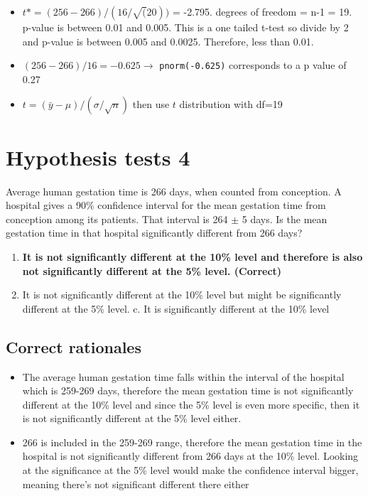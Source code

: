 \documentclass[letterpaper,9pt,twoside,printwatermark=false]{pinp}
\providecommand{\tightlist}{%
  \setlength{\itemsep}{0pt}\setlength{\parskip}{0pt}}
\begin{document}
\begin{itemize}
\tightlist
\item
  \(t* = (256-266) / (16 / \sqrt(20))\) = -2.795. degrees of freedom =
  n-1 = 19. p-value is between 0.01 and 0.005. This is a one tailed
  t-test so divide by 2 and p-value is between 0.005 and 0.0025.
  Therefore, less than 0.01.
\item
  \((256 - 266)/16 = -0.625 \to\) \texttt{pnorm(-0.625)} corresponds to
  a p value of 0.27
\item
  \(t = (\bar{y}-\mu)/(\sigma/\sqrt{n})\) then use \(t\) distribution
  with df=19
\end{itemize}

\section{Hypothesis tests 4}\label{hypothesis-tests-4}

Average human gestation time is 266 days, when counted from conception.
A hospital gives a 90\% confidence interval for the mean gestation time
from conception among its patients. That interval is 264 \(\pm\) 5 days.
Is the mean gestation time in that hospital significantly different from
266 days?

\begin{enumerate}
\def\labelenumi{\alph{enumi}.}
\tightlist
\item
  \textbf{It is not significantly different at the 10\% level and
  therefore is also not significantly different at the 5\% level.
  (Correct)}
\item
  It is not significantly different at the 10\% level but might be
  significantly different at the 5\% level. c. It is significantly
  different at the 10\% level
\end{enumerate}

\subsection{Correct rationales}\label{correct-rationales-3}

\begin{itemize}
\tightlist
\item
  The average human gestation time falls within the interval of the
  hospital which is 259-269 days, therefore the mean gestation time is
  not significantly different at the 10\% level and since the 5\% level
  is even more specific, then it is not significantly different at the
  5\% level either.
\item
  266 is included in the 259-269 range, therefore the mean gestation
  time in the hospital is not significantly different from 266 days at
  the 10\% level. Looking at the significance at the 5\% level would
  make the confidence interval bigger, meaning there's not significant
  different there either
\end{itemize}
\end{document}
